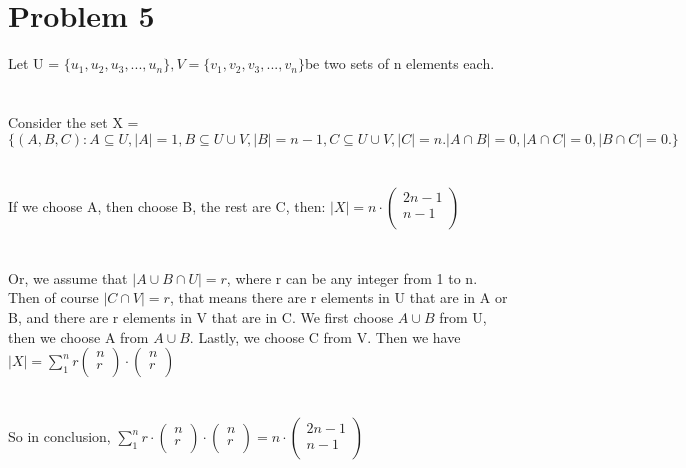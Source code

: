 \documentclass{article}
\begin{document}
\section{Problem 5}
Let U = $\{u_1, u_2, u_3, ..., u_n\}, V = \{v_1, v_2, v_3, ..., v_n\} $be two sets of n elements each.\\
\\ \hspace*{\fill} \\
Consider the set X = $\{ (A,B,C): A \subseteq U, |A| = 1, B \subseteq U \cup V, |B| = n-1, C \subseteq U \cup V, |C| = n. |A \cap B| = 0, |A \cap C| = 0, |B \cap C| = 0.\}$\\
\\ \hspace*{\fill} \\
If we choose A, then choose B, the rest are C, then: $|X| = n \cdot 
\begin{pmatrix}
  2n-1\\
  n-1\\
\end{pmatrix}$\\
\\ \hspace*{\fill} \\
Or, we assume that $|A \cup B \cap U| = r$, where r can be any integer from 1 to n. Then of course $|C \cap V| = r$, that means there are r elements in U that are in A or B, and there are r elements in V that are in C. We first choose $A \cup B$ from U, then we choose A from $A \cup B$. Lastly, we choose C from V. Then we have $|X| = \sum_{1}^{n} r
\begin{pmatrix}
  n\\
  r\\
\end{pmatrix} \cdot
\begin{pmatrix}
  n\\
  r\\
\end{pmatrix} $\\
\\ \hspace*{\fill} \\
So in conclusion, $\sum_{1}^{n}r \cdot 
\begin{pmatrix}
  n\\
  r\\
\end{pmatrix} \cdot
\begin{pmatrix}
  n\\
  r\\
\end{pmatrix} 
 = n \cdot 
\begin{pmatrix}
  2n-1\\
  n-1\\
\end{pmatrix}$\\
\\ \hspace*{\fill} \\
\newpage
\end{document}
